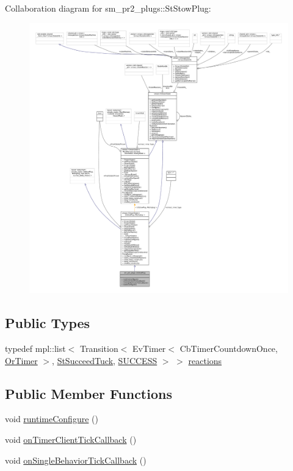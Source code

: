 Collaboration diagram for sm\+\_\+pr2\+\_\+plugs\+:\+:St\+Stow\+Plug\+:
\nopagebreak
\begin{figure}[H]
\begin{center}
\leavevmode
\includegraphics[width=350pt]{structsm__pr2__plugs_1_1StStowPlug__coll__graph}
\end{center}
\end{figure}
\subsection*{Public Types}
\begin{DoxyCompactItemize}
\item 
typedef mpl\+::list$<$ Transition$<$ Ev\+Timer$<$ Cb\+Timer\+Countdown\+Once, \hyperlink{classsm__pr2__plugs_1_1OrTimer}{Or\+Timer} $>$, \hyperlink{structsm__pr2__plugs_1_1StSucceedTuck}{St\+Succeed\+Tuck}, \hyperlink{classSUCCESS}{S\+U\+C\+C\+E\+SS} $>$ $>$ \hyperlink{structsm__pr2__plugs_1_1StStowPlug_a30e66bd99b3feb400c8896aec05e5c4b}{reactions}
\end{DoxyCompactItemize}
\subsection*{Public Member Functions}
\begin{DoxyCompactItemize}
\item 
void \hyperlink{structsm__pr2__plugs_1_1StStowPlug_a7a8c96a9affcf5e333fc0e96575141ec}{runtime\+Configure} ()
\item 
void \hyperlink{structsm__pr2__plugs_1_1StStowPlug_ae757556cb3fd58c9db771327744973bf}{on\+Timer\+Client\+Tick\+Callback} ()
\item 
void \hyperlink{structsm__pr2__plugs_1_1StStowPlug_a69f661686818a913827a9048ebe4d259}{on\+Single\+Behavior\+Tick\+Callback} ()
\end{DoxyCompactItemize}

